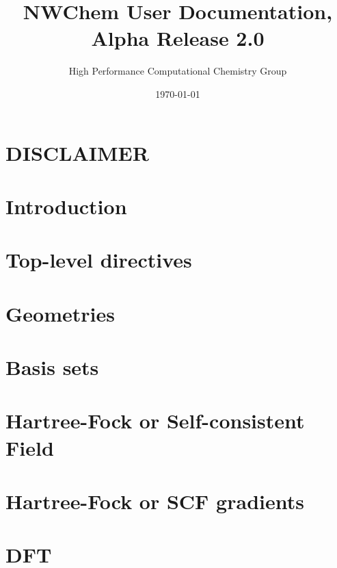 \setlength{\parskip}{6pt}

\newcommand{\nwchemversion}{2.0}
\newcommand{\nwchemyear}{1996}



\title{\bf\Large NWChem User Documentation, Alpha Release \nwchemversion}
\author{High Performance Computational Chemistry Group}
\date{\today}
\maketitle

\section*{\center DISCLAIMER}


\clearpage

\tableofcontents

\clearpage

\section{Introduction}


\section{Top-level directives}


\section{Geometries}


\section{Basis sets}


\section{Hartree-Fock or Self-consistent Field} 


\section{Hartree-Fock or SCF gradients}


\section{DFT}


